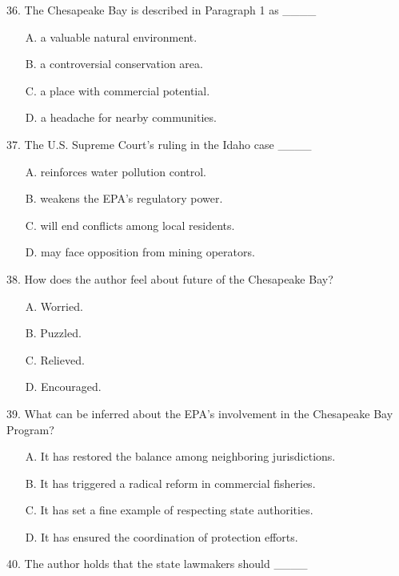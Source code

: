 \documentclass[UTF8,11pt]{ctexart}
\begin{document}
36. The Chesapeake Bay is described in Paragraph 1 as \_\_\_\_


\begin{itemize}[leftmargin=2em,itemsep=.2em,topsep=.4em]\item[A.] a valuable natural environment.
\item[B.] a controversial conservation area.
\item[C.] a place with commercial potential.
\item[D.] a headache for nearby communities.
\end{itemize}

37. The U.S. Supreme Court’s ruling in the Idaho case \_\_\_\_


\begin{itemize}[leftmargin=2em,itemsep=.2em,topsep=.4em]\item[A.] reinforces water pollution control.
\item[B.] weakens the EPA’s regulatory power.
\item[C.] will end conflicts among local residents.
\item[D.] may face opposition from mining operators.
\end{itemize}

38. How does the author feel about future of the Chesapeake Bay?


\begin{itemize}[leftmargin=2em,itemsep=.2em,topsep=.4em]\item[A.] Worried.
\item[B.] Puzzled.
\item[C.] Relieved.
\item[D.] Encouraged.
\end{itemize}

39. What can be inferred about the EPA’s involvement in the Chesapeake Bay Program?


\begin{itemize}[leftmargin=2em,itemsep=.2em,topsep=.4em]\item[A.] It has restored the balance among neighboring jurisdictions.
\item[B.] It has triggered a radical reform in commercial fisheries.
\item[C.] It has set a fine example of respecting state authorities.
\item[D.] It has ensured the coordination of protection efforts.
\end{itemize}

40. The author holds that the state lawmakers should \_\_\_\_
\end{document}
